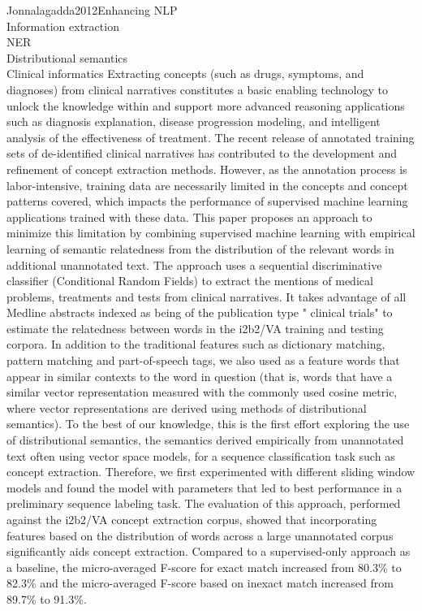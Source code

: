 \begin{review}{Jonnalagadda2012Enhancing}
			{
				NLP\\
				Information extraction\\
				NER\\
				Distributional semantics\\
				Clinical informatics
			}
			{
				Extracting concepts (such as drugs, symptoms, and diagnoses) from clinical narratives constitutes a basic enabling technology to unlock the knowledge within and support more advanced reasoning applications such as diagnosis explanation, disease progression modeling, and intelligent analysis of the effectiveness of treatment. 
				The recent release of annotated training sets of de-identified clinical narratives has contributed to the development and refinement of concept extraction methods. However, as the annotation process is labor-intensive, training data are necessarily limited in the concepts and concept patterns covered, which impacts the performance of supervised machine learning applications trained with these data. 
				This paper proposes an approach to minimize this limitation by combining supervised machine learning with empirical learning of semantic relatedness from the distribution of the relevant words in additional unannotated text.
				The approach uses a sequential discriminative classifier (Conditional Random Fields) to extract the mentions of medical problems, treatments and tests from clinical narratives. 
				It takes advantage of all Medline abstracts indexed as being of the publication type " clinical trials" to estimate the relatedness between words in the i2b2/VA training and testing corpora. 
				In addition to the traditional features such as dictionary matching, pattern matching and part-of-speech tags, we also used as a feature words that appear in similar contexts to the word in question (that is, words that have a similar vector representation measured with the commonly used cosine metric, where vector representations are derived using methods of distributional semantics). 
				To the best of our knowledge, this is the first effort exploring the use of distributional semantics, the semantics derived empirically from unannotated text often using vector space models, for a sequence classification task such as concept extraction.
				Therefore, we first experimented with different sliding window models and found the model with parameters that led to best performance in a preliminary sequence labeling task.
				The evaluation of this approach, performed against the i2b2/VA concept extraction corpus, showed that incorporating features based on the distribution of words across a large unannotated corpus significantly aids concept extraction. Compared to a supervised-only approach as a baseline, the micro-averaged F-score for exact match increased from 80.3\% to 82.3\% and the micro-averaged F-score based on inexact match increased from 89.7\% to 91.3\%. 
}
\end{review}
